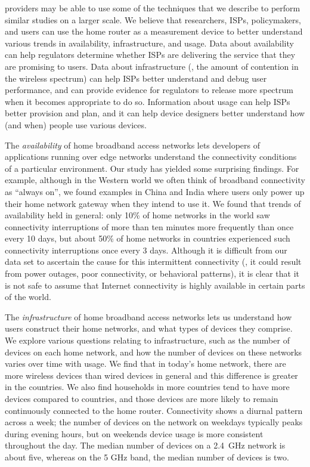 providers may be able to use some of the techniques that we describe to
perform similar studies on a larger scale.  We believe that researchers,
ISPs, policymakers, and users can use the home router as a measurement
device to better understand various trends in availability,
infrastructure, and usage.  Data about availability can help regulators
determine whether ISPs are delivering the service that they are
promising to users.  Data about infrastructure (\eg, the amount of
contention in the wireless spectrum) can help ISPs better understand and
debug user performance, and can provide evidence for regulators
to release more spectrum when it becomes appropriate to do so.
Information about usage can help ISPs better provision and plan, and it
can help device designers better understand how (and when) people use
various devices.

The {\em availability} of home broadband access networks lets developers
of applications running over edge networks understand the connectivity
conditions of a particular environment.  Our study has yielded some
surprising findings. For example, although in the Western world we often
think of broadband connectivity as ``always on'', we found examples in
China and India where users only power up their home network gateway
when they intend to use it.  We found that trends of availability
held in general: only 10\% of home networks in the \developed{} world saw
connectivity interruptions of more than ten minutes more frequently than
once every 10 days, but about 50\% of home networks in \developing{}
countries experienced such connectivity interruptions once every 3 days.
Although it is difficult from our data set to ascertain the cause for
this intermittent connectivity (\ie, it could result from power outages,
poor connectivity, or behavioral patterns), it is clear that it is not
safe to assume that Internet connectivity is highly available in certain
parts of the world.

The {\em infrastructure} of home broadband access networks lets us understand
how users construct their home networks, and what types of devices they
comprise.  We explore various questions relating to infrastructure, such as the
number of devices on each home network, and how the number of devices on these
networks varies over time with usage.  We find that in today's home network, there
are more wireless devices than wired devices in
general and this difference is greater in the \developing{} countries.  
We also find households in more \developed{} countries tend to have more devices 
compared to \developing{} countries, and
those devices are more likely to remain continuously connected to the home router.
Connectivity shows a diurnal pattern across a week;
the number of devices on the network on
weekdays typically peaks during evening hours, but on weekends device usage is
more consistent throughout the day.  The median
number of devices on a 2.4~GHz network is about five, whereas on the 5 GHz band,
the median number of devices is two.
  

